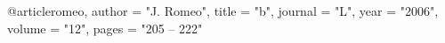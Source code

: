 @article{romeo,
	 author = "J. Romeo",
	 title = "b",
	 journal = "L",
	 year = "2006",
	 volume = "12",
	 pages = "205 -- 222"
	 }